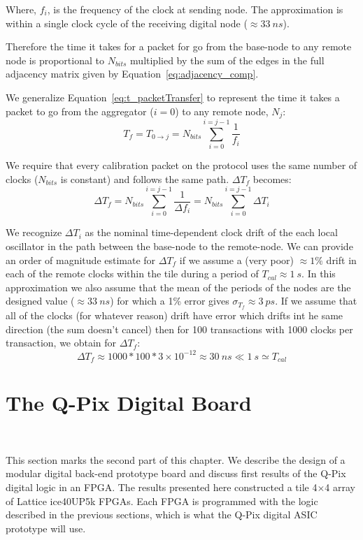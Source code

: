 Where, $f_{i}$, is the frequency of the clock at sending node. The approximation is within a single clock cycle of the receiving digital node ($\approx 33~\unit{ns}$).

Therefore the time it takes for a packet for go from the base-node to any remote node is proportional to $N_{bits}$ multiplied by the sum of the edges in the full adjacency matrix given by Equation~\ref{eq:adjacency_comp}.

We generalize Equation~\ref{eq:t_packetTransfer} to represent the time it takes a packet to go from the aggregator ($i = 0$) to any remote node, $N_{j}$:
\begin{equation}
  T_{f} = T_{0\rightarrow j} = N_{bits}\sum_{i=0}^{i=j-1}\frac{1}{f_{i}}
\end{equation}

We require that every calibration packet on the protocol uses the same number of clocks ($N_{bits}$ is constant) and follows the same path. $\Delta T_{f}$ becomes:
\begin{equation}
  \Delta T_{f} = N_{bits}\sum_{i=0}^{i=j-1}\frac{1}{\Delta f_{i}} = N_{bits} \sum_{i=0}^{i=j-1}\Delta T_{i}
\end{equation}

We recognize $\Delta T_{i}$ as the nominal time-dependent clock drift of the each local oscillator in the path between the base-node to the remote-node.
We can provide an order of magnitude estimate for $\Delta T_{f}$ if we assume a (very poor) $\approx 1\%$ drift in each of the remote clocks within the tile during a period of $T_{cal} \approx 1~\unit{s}$.
In this approximation we also assume that the mean of the periods of the nodes are the designed value ($\approx 33~\unit{ns}$) for which a 1\% error gives $\sigma_{T_{f}} \approx 3~\unit{ps}$.
If we assume that all of the clocks (for whatever reason) drift have error which drifts int he same direction (the sum doesn't cancel) then for 100 transactions with 1000 clocks per transaction, we obtain for $\Delta T_{f}$:
\begin{equation}
  \Delta T_{f} \approx 1000 * 100 * 3\times 10^{-12} \approx 30~\unit{ns} \ll 1~\unit{s} \simeq T_{cal}
\end{equation}

\section{The Q-Pix Digital Board}~\label{sec:qdb_prototype}

This section marks the second part of this chapter.
We describe the design of a modular digital back-end prototype board and discuss first results of the Q-Pix digital logic in an FPGA.
The results presented here constructed a tile 4$\times$4 array of Lattice ice40UP5k FPGAs.
Each FPGA is programmed with the logic described in the previous sections, which is what the Q-Pix digital ASIC prototype will use.

